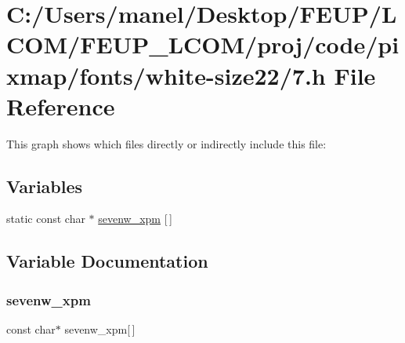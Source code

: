 \hypertarget{white-size22_27_8h}{}\section{C\+:/\+Users/manel/\+Desktop/\+F\+E\+U\+P/\+L\+C\+O\+M/\+F\+E\+U\+P\+\_\+\+L\+C\+O\+M/proj/code/pixmap/fonts/white-\/size22/7.h File Reference}
\label{white-size22_27_8h}
This graph shows which files directly or indirectly include this file\+:
\subsection*{Variables}
\begin{DoxyCompactItemize}
\item 
static const char $\ast$ \mbox{\hyperlink{white-size22_27_8h_a12e4c3b21fd5fe4d403d0f322cccea26}{sevenw\+\_\+xpm}} \mbox{[}$\,$\mbox{]}
\end{DoxyCompactItemize}


\subsection{Variable Documentation}
\mbox{\label{white-size22_27_8h_a12e4c3b21fd5fe4d403d0f322cccea26}} 
\subsubsection{\texorpdfstring{sevenw\_xpm}{sevenw\_xpm}}
{\footnotesize\ttfamily const char$\ast$ sevenw\+\_\+xpm\mbox{[}$\,$\mbox{]}\hspace{0.3cm}{\ttfamily [static]}}

